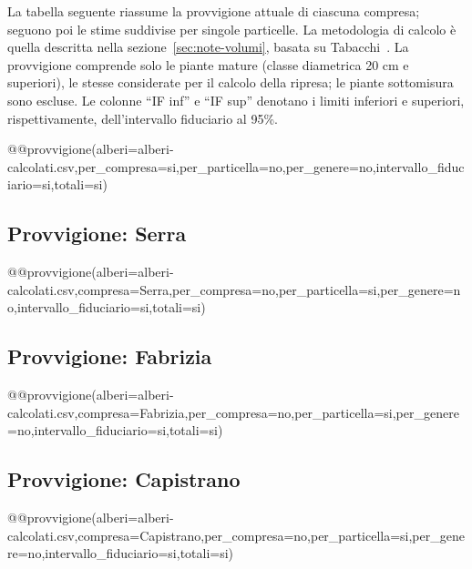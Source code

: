 La tabella seguente riassume la provvigione attuale di ciascuna compresa;
seguono poi le stime suddivise per singole particelle. La metodologia di calcolo
è quella descritta nella sezione~\ref{sec:note-volumi}, basata su
Tabacchi~\cite{tabacchi:2011}. La provvigione comprende solo le piante mature
(classe diametrica 20 cm e superiori), le stesse considerate per il calcolo
della ripresa; le piante sottomisura sono escluse. Le colonne ``IF inf'' e ``IF
sup'' denotano i limiti inferiori e superiori, rispettivamente, dell'intervallo
fiduciario al 95\%.

@@provvigione(alberi=alberi-calcolati.csv,per_compresa=si,per_particella=no,per_genere=no,intervallo_fiduciario=si,totali=si)

\subsection*{Provvigione: Serra}
@@provvigione(alberi=alberi-calcolati.csv,compresa=Serra,per_compresa=no,per_particella=si,per_genere=no,intervallo_fiduciario=si,totali=si)
\clearpage

\subsection*{Provvigione: Fabrizia}
@@provvigione(alberi=alberi-calcolati.csv,compresa=Fabrizia,per_compresa=no,per_particella=si,per_genere=no,intervallo_fiduciario=si,totali=si)

\subsection*{Provvigione: Capistrano}
@@provvigione(alberi=alberi-calcolati.csv,compresa=Capistrano,per_compresa=no,per_particella=si,per_genere=no,intervallo_fiduciario=si,totali=si)

\clearpage
